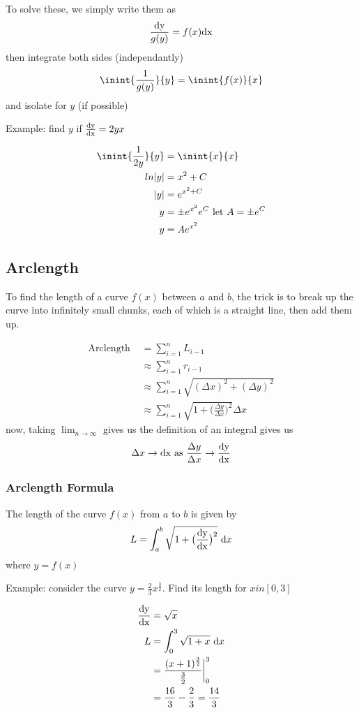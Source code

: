 \documentclass[12pt]{article}
\begin{document}
To solve these, we simply write them as \[ \frac{{\rm dy}}{g(y)} = f(x){\rm dx} \] then integrate both sides (independantly) \[ \inint{\frac{1}{g(y)}}{y} = \inint{f(x)}{x} \] and isolate for $y$ (if possible)

Example: find $y$ if $\frac{{\rm dy}}{{\rm dx}} = 2yx$

\begin{align*}
\inint{\frac{1}{2y}}{y} &= \inint{x}{x}\\
ln|y| &= x^2 + C\\
|y| &= e^{x^2 + C}\\
y &= \pm e^{x^2}e^C \text{ let $A = \pm e^C$}\\
y &= Ae^{x^2}
\end{align*}

\subsection*{Arclength}
To find the length of a curve $f(x)$ between $a$ and $b$, the trick is to break up the curve into infinitely small chunks, each of which is a straight line, then add them up.

\begin{align*}
\text{Arclength } &= \sum_{i=1}^n L_{i-1}\\
&\approx \sum_{i=1}^n r_{i-1}\\
&\approx \sum_{i=1}^n \sqrt{(\Delta x)^2 + (\Delta y)^2}\\
&\approx \sum_{i=1}^n \sqrt{1+\bigl(\frac{\Delta y}{\Delta x}\bigl)^2} \Delta x
\end{align*}
now, taking $\displaystyle\lim_{n\to\infty}$ gives us the definition of an integral gives us \[ \Delta x \to {\rm dx\ as\ } \frac{\Delta y}{\Delta x} \to \frac{{\rm dy}}{{\rm dx}} \]

\subsubsection*{Arclength Formula}
The length of the curve $f(x)$ from $a$ to $b$ is given by \[ L = \int_a^b \sqrt{1+\bigl(\frac{{\rm dy}}{{\rm dx}}\bigl)^2} \ {\rm d} x \] where $y = f(x)$

Example: consider the curve $y = \frac{2}{3}x^{\frac{3}{2}}$. Find its length for $xin [0,3]$

\begin{align*}
\frac{{\rm dy}}{{\rm dx}} &= \sqrt{x}\\
L &= \int_0^3 \sqrt{1+x} \ {\rm d} x\\
&= \frac{(x+1)^{\frac{3}{2}}}{\frac{3}{2}} \bigg|_0^3\\
&= \frac{16}{3} - \frac{2}{3} = \frac{14}{3}
\end{align*}
\end{document}

